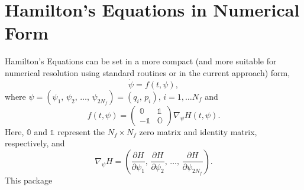 \documentclass{article}
\newcommand{\pd}[2]{\frac{\partial#1}{\partial#2}}
\begin{document}
\section{Hamilton's Equations in Numerical Form}
Hamilton's Equations can be set in a more compact (and more suitable for
numerical resolution using standard routines or in the current approach) form,
\begin{equation}\label{eq:HEterse}
  \dot \psi=f(t,\psi),
\end{equation}
where $\psi=(\psi_1,\,\psi_2,\,\ldots,\,\psi_{2N_f})=(q_i,\,p_i)$,
$i=1,\ldots N_f$ and
\begin{equation}
  f(t,\psi)=
  \begin{pmatrix}
    \mathbb{0}&\mathbb{1}\\
    -\mathbb{1} &\mathbb{O}
  \end{pmatrix}\nabla_\psi H(t,\psi).
\end{equation}
Here, $\mathbb{0}$ and $\mathbb{1}$ represent the $N_f\times N_f$ zero matrix
and identity matrix, respectively, and
\begin{equation*}
  \nabla_\psi H=\left(
    \pd{H}{\psi_1},\,
    \pd{H}{\psi_2},\,\ldots,\,
    \pd{H}{\psi_{2N_f}}
    \right).
\end{equation*}
This package
\end{document}
